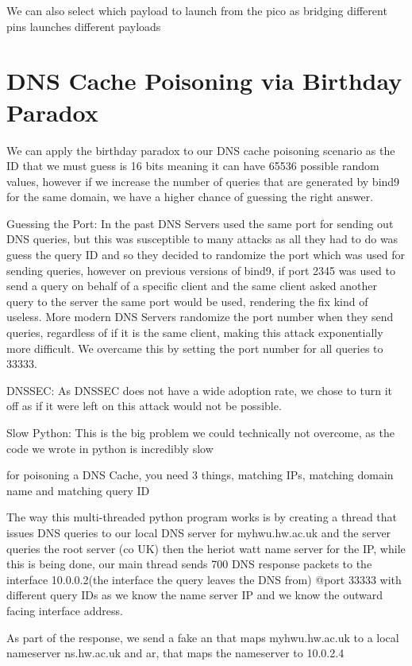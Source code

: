 \documentclass[11pt]{report}
\begin{document}
We can also select which payload to launch from the pico as bridging different pins launches different payloads

\section*{DNS Cache Poisoning via Birthday Paradox}

We can apply the birthday paradox to our DNS cache poisoning scenario as the ID that we must guess is 16 bits meaning it can have 65536 possible random values, however if we increase the number of queries that are generated by bind9 for the same domain, we have a higher chance of guessing the right answer. 
  
Guessing the Port: 
In the past DNS Servers used the same port for sending out DNS queries, but this was susceptible to many attacks as all they had to do was guess the query ID and so they decided to randomize the port which was used for sending queries, however on previous versions of bind9, if port 2345 was used to send a query on behalf of a specific client and the same client asked another query to the server the same port would be used, rendering the fix kind of useless. 
More modern DNS Servers randomize the port number when they send queries, regardless of if it is the same client, making this attack exponentially more difficult.  
We overcame this by setting the port number for all queries to 33333. 
  
DNSSEC: 
As DNSSEC does not have a wide adoption rate, we chose to turn it off as if it were left on this attack would not be possible. 
  
Slow Python: 
This is the big problem we could technically not overcome, as the code we wrote in python is incredibly slow  
  
for poisoning a DNS Cache, you need 3 things, matching IPs, matching domain name and matching query ID 
  
The way this multi-threaded python program works is by creating a thread that issues DNS queries to our local DNS server for myhwu.hw.ac.uk and the server queries the root server (co UK) then the heriot watt name server for the IP, while this is being done, our main thread sends 700 DNS response packets to the interface 10.0.0.2(the interface the query leaves the DNS from) @port 33333 with different query IDs as we know the name server IP and we know the outward facing interface address. 
  
As part of the response, we send a fake an that maps myhwu.hw.ac.uk to a local nameserver ns.hw.ac.uk and ar, that maps the nameserver to 10.0.2.4 
  
\end{document}
